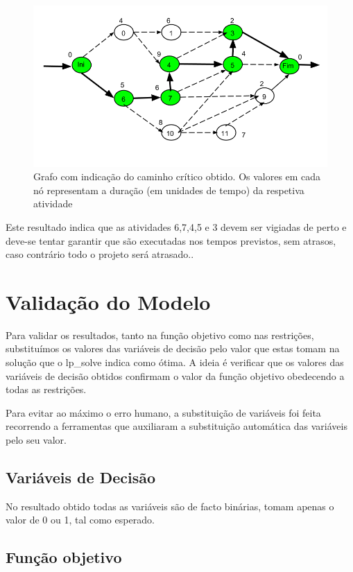 \begin{figure}[<+htpb+>]
\centering
		  \includegraphics[scale=0.5]{./img/p1_caminho_critico}
\caption{Grafo com indicação do caminho crítico obtido. Os valores em cada nó representam a duração (em unidades de tempo) da respetiva atividade}
\label{p1:fig:caminho_critico}
\end{figure}

Este resultado indica que as atividades 6,7,4,5 e 3 devem ser vigiadas de perto e deve-se tentar garantir que são executadas nos tempos previstos, sem atrasos, caso contrário todo o projeto será atrasado..

\section{Validação do Modelo}

Para validar os resultados, tanto na função objetivo como nas restrições,
substituímos os valores das variáveis de decisão pelo valor que estas tomam na
solução que o lp\_solve indica como ótima. A ideia é verificar que os valores das
variáveis de decisão obtidos confirmam o valor da função objetivo obedecendo
a todas as restrições.

Para evitar ao máximo o erro humano, a substituição de variáveis foi feita
recorrendo a ferramentas que auxiliaram a substituição automática das variáveis
pelo seu valor.

\subsection{Variáveis de Decisão}

No resultado obtido todas as variáveis são de facto binárias, tomam apenas
o valor de 0 ou 1, tal como esperado.

\subsection{Função objetivo}

